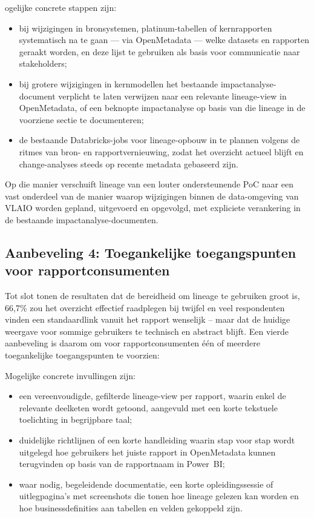 ogelijke concrete stappen zijn:
\begin{itemize}
	\item bij wijzigingen in bronsystemen, platinum-tabellen of kernrapporten systematisch na te gaan — via OpenMetadata — welke datasets en rapporten geraakt worden, en deze lijst te gebruiken als basis voor communicatie naar stakeholders;
	\item bij grotere wijzigingen in kernmodellen het bestaande impactanalyse-document verplicht te laten verwijzen naar een relevante lineage-view in OpenMetadata, of een beknopte impactanalyse op basis van die lineage in de voorziene sectie te documenteren;
	\item de bestaande Databricks-jobs voor lineage-opbouw in te plannen volgens de ritmes van bron- en rapportvernieuwing, zodat het overzicht actueel blijft en change-analyses steeds op recente metadata gebaseerd zijn.
\end{itemize}

Op die manier verschuift lineage van een louter ondersteunende PoC naar een vast onderdeel van de manier waarop wijzigingen binnen de data-omgeving van VLAIO worden gepland, uitgevoerd en opgevolgd, met expliciete verankering in de bestaande impactanalyse-documenten.

\subsection*{Aanbeveling 4: Toegankelijke toegangspunten voor rapportconsumenten}

Tot slot tonen de resultaten dat de bereidheid om lineage te gebruiken groot is, 66{,}7\% zou het overzicht effectief raadplegen bij twijfel en veel respondenten vinden een standaardlink vanuit het rapport wenselijk -- maar dat de huidige weergave voor sommige gebruikers te technisch en abstract blijft.
Een vierde aanbeveling is daarom om voor rapportconsumenten één of meerdere toegankelijke toegangspunten te voorzien:

Mogelijke concrete invullingen zijn:
\begin{itemize}
	\item een vereenvoudigde, gefilterde lineage-view per rapport, waarin enkel de relevante deelketen wordt getoond, aangevuld met een korte tekstuele toelichting in begrijpbare taal;
	\item duidelijke richtlijnen of een korte handleiding waarin stap voor stap wordt uitgelegd hoe gebruikers het juiste rapport in OpenMetadata kunnen terugvinden op basis van de rapportnaam in Power~BI;
	\item waar nodig, begeleidende documentatie, een korte opleidingssessie of uitlegpagina's met screenshots die tonen hoe lineage gelezen kan worden en hoe businessdefinities aan tabellen en velden gekoppeld zijn.
\end{itemize}

